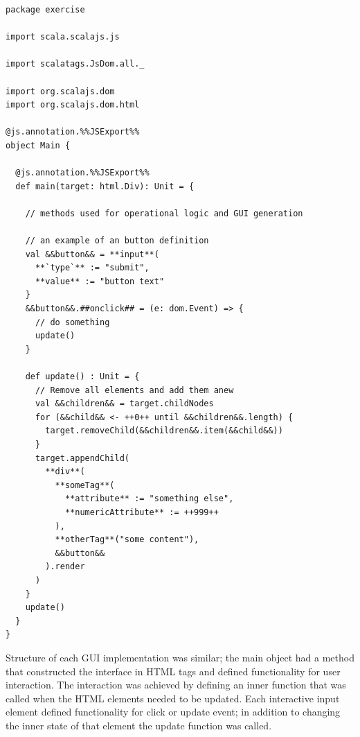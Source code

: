 

\begin{program}
\begin{lstlisting}
package exercise

import scala.scalajs.js

import scalatags.JsDom.all._

import org.scalajs.dom
import org.scalajs.dom.html

@js.annotation.%%JSExport%%
object Main {
  
  @js.annotation.%%JSExport%%
  def main(target: html.Div): Unit = {

    // methods used for operational logic and GUI generation

    // an example of an button definition
    val &&button&& = **input**(
      **`type`** := "submit",
      **value** := "button text"
    }
    &&button&&.##onclick## = (e: dom.Event) => {
      // do something
      update()
    }

    def update() : Unit = {
      // Remove all elements and add them anew
      val &&children&& = target.childNodes
      for (&&child&& <- ++0++ until &&children&&.length) {
        target.removeChild(&&children&&.item(&&child&&))
      }
      target.appendChild(
        **div**(
          **someTag**(
            **attribute** := "something else",
            **numericAttribute** := ++999++
          ),
          **otherTag**("some content"),
          &&button&&
        ).render
      )
    }
    update()
  }
}
\end{lstlisting}
\end{program}
Structure of each GUI implementation was similar; the main object had a method that constructed the interface in HTML tags and defined functionality for user interaction. The interaction was achieved by defining an inner function that was called when the HTML elements needed to be updated. Each interactive input element defined functionality for click or update event; in addition to changing the inner state of that element the update function was called.

